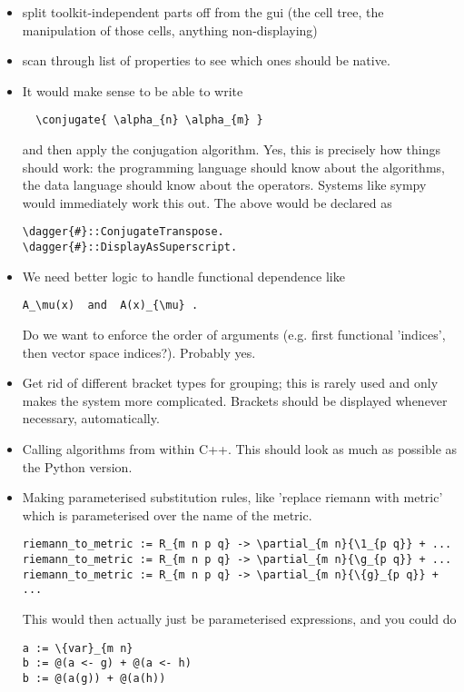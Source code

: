 \documentclass[11pt]{article}
\begin{document}
\begin{itemize}
\item  split toolkit-independent parts off from the gui (the cell tree,
  the manipulation of those cells, anything non-displaying)
\item scan through list of properties to see which ones should be
native.

\item It would make sense to be able to write
\begin{lstlisting}
  \conjugate{ \alpha_{n} \alpha_{m} }
\end{lstlisting}
and then apply the conjugation algorithm. Yes, this is precisely how
things should work: the programming language should know about the
algorithms, the data language should know about the operators. Systems
like sympy would immediately work this out. The above would be
declared as
\begin{lstlisting}
\dagger{#}::ConjugateTranspose.
\dagger{#}::DisplayAsSuperscript.
\end{lstlisting}
\item We need better logic to handle functional dependence like
\begin{lstlisting}
A_\mu(x)  and  A(x)_{\mu} .
\end{lstlisting}
Do we want to enforce the order of arguments (e.g. first functional
'indices', then vector space indices?).  Probably yes.

\item Get rid of different bracket types for grouping; this is rarely used and only
makes the system more complicated. Brackets should be displayed
whenever necessary, automatically. 

\item Calling algorithms from within C++. This should look as much as possible
as the Python version.

\item Making parameterised substitution rules, like 'replace riemann with metric' 
which is parameterised over the name of the metric.
\begin{lstlisting}
riemann_to_metric := R_{m n p q} -> \partial_{m n}{\1_{p q}} + ...
riemann_to_metric := R_{m n p q} -> \partial_{m n}{\g_{p q}} + ...
riemann_to_metric := R_{m n p q} -> \partial_{m n}{\{g}_{p q}} + ...
\end{lstlisting}
This would then actually just be parameterised expressions, and you could do
\begin{lstlisting}
a := \{var}_{m n}
b := @(a <- g) + @(a <- h)
b := @(a(g)) + @(a(h))
\end{lstlisting}


\end{itemize}
\end{document}
